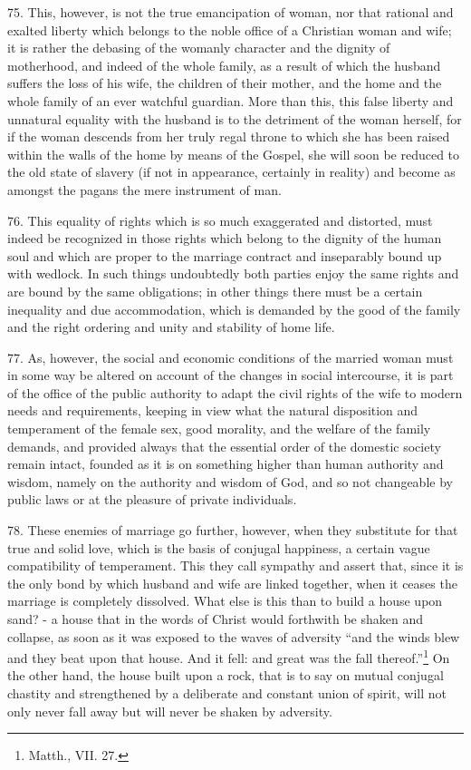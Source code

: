 \documentclass[12pt,a4paper]{book}
\begin{document}
75. This, however, is not the true emancipation of woman, nor that rational and exalted liberty which belongs to the noble office of a Christian woman and wife; it is rather the debasing of the womanly character and the dignity of motherhood, and indeed of the whole family, as a result of which the husband suffers the loss of his wife, the children of their mother, and the home and the whole family of an ever watchful guardian. More than this, this false liberty and unnatural equality with the husband is to the detriment of the woman herself, for if the woman descends from her truly regal throne to which she has been raised within the walls of the home by means of the Gospel, she will soon be reduced to the old state of slavery (if not in appearance, certainly in reality) and become as amongst the pagans the mere instrument of man.

76. This equality of rights which is so much exaggerated and distorted, must indeed be recognized in those rights which belong to the dignity of the human soul and which are proper to the marriage contract and inseparably bound up with wedlock. In such things undoubtedly both parties enjoy the same rights and are bound by the same obligations; in other things there must be a certain inequality and due accommodation, which is demanded by the good of the family and the right ordering and unity and stability of home life.

77. As, however, the social and economic conditions of the married woman must in some way be altered on account of the changes in social intercourse, it is part of the office of the public authority to adapt the civil rights of the wife to modern needs and requirements, keeping in view what the natural disposition and temperament of the female sex, good morality, and the welfare of the family demands, and provided always that the essential order of the domestic society remain intact, founded as it is on something higher than human authority and wisdom, namely on the authority and wisdom of God, and so not changeable by public laws or at the pleasure of private individuals.

78. These enemies of marriage go further, however, when they substitute for that true and solid love, which is the basis of conjugal happiness, a certain vague compatibility of temperament. This they call sympathy and assert that, since it is the only bond by which husband and wife are linked together, when it ceases the marriage is completely dissolved. What else is this than to build a house upon sand? - a house that in the words of Christ would forthwith be shaken and collapse, as soon as it was exposed to the waves of adversity ``and the winds blew and they beat upon that house. And it fell: and great was the fall thereof.''\footnote{Matth., VII. 27.} On the other hand, the house built upon a rock, that is to say on mutual conjugal chastity and strengthened by a deliberate and constant union of spirit, will not only never fall away but will never be shaken by adversity.
\end{document}
